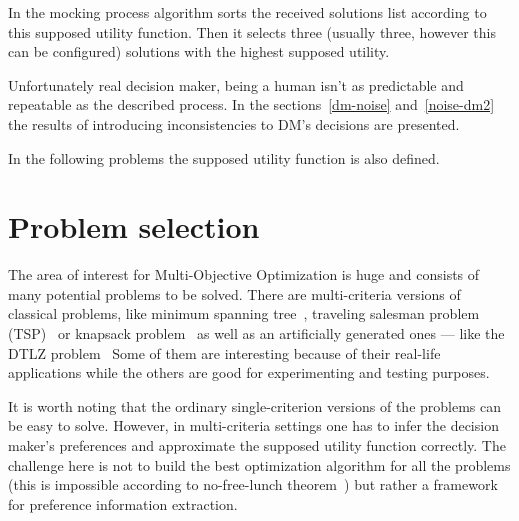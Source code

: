 In the mocking process algorithm sorts the received solutions list according
to this supposed utility function. Then it selects three (usually three,
however this can be configured) solutions with the highest supposed utility.

Unfortunately real decision maker, being a human isn't as predictable and
repeatable as the described process. In the sections~\ref{dm-noise}
and~\ref{noise-dm2} the results of introducing inconsistencies to DM's
decisions are presented.

In the following problems the supposed utility function is also defined.

\section{Problem selection}

The area of interest for Multi-Objective Optimization is huge and consists of
many potential problems to be solved. There are multi-criteria versions of
classical problems, like minimum spanning tree~\cite{GH85}, traveling salesman
problem (TSP)~\cite{CRS+01} or knapsack problem~\cite{PGP10} as well as an
artificially generated ones --- like the DTLZ problem~\cite{DTL+02} Some of
them are interesting because of their real-life applications while the others
are good for experimenting and testing purposes.

It is worth noting that the ordinary single-criterion versions of the problems
can be easy to solve. However, in multi-criteria settings one has to infer the
decision maker's preferences and approximate the supposed utility function
correctly. The challenge here is not to build the best optimization algorithm
for all the problems (this is impossible according to no-free-lunch
theorem~\cite{WM97}) but rather a framework for preference information
extraction.

